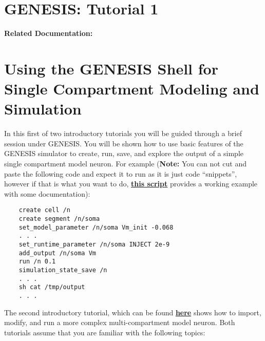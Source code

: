 \documentclass[12pt]{article}
\begin{document}
\section*{GENESIS: Tutorial 1}

{\bf Related Documentation:}

\section*{Using the GENESIS Shell for\\Single Compartment Modeling and Simulation}

In this first of two introductory tutorials you will be guided through a brief session under GENESIS. You will be shown how to use basic features of the GENESIS simulator to create, run, save, and explore the output of a simple single compartment model neuron. For example ({\bf Note:} You can not cut and paste the following code and expect it to run as it is just code ``snippets'', however if that is what you want to do, \href{../example-script1/example-script1.tex}{\bf this script} provides a working example with some documentation):

\begin{verbatim}
    create cell /n
    create segment /n/soma
    set_model_parameter /n/soma Vm_init -0.068
    . . .
    set_runtime_parameter /n/soma INJECT 2e-9
    add_output /n/soma Vm
    run /n 0.1
    simulation_state_save /n
    . . . 
    sh cat /tmp/output
    . . . 
\end{verbatim}
The second introductory tutorial, which can be found \href{../tutorial2/tutorial2.tex}{\bf here} shows how to import, modify, and run a more complex multi-compartment model neuron. Both tutorials assume that you are familiar with the following topics:
\end{document}

